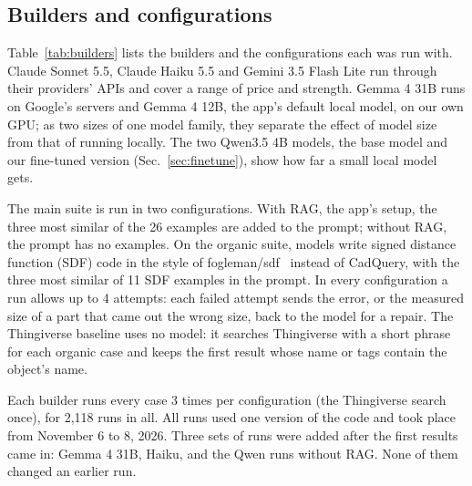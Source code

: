 \subsection{Builders and configurations}
Table~\ref{tab:builders} lists the builders and the configurations each was run with.
Claude Sonnet 5.5, Claude Haiku 5.5 and Gemini 3.5 Flash Lite run through their providers' APIs and cover a range of price and strength.
Gemma 4 31B runs on Google's servers and Gemma 4 12B, the app's default local model, on our own GPU; as two sizes of one model family, they separate the effect of model size from that of running locally.
The two Qwen3.5 4B models, the base model and our fine-tuned version (Sec.~\ref{sec:finetune}), show how far a small local model gets.

The main suite is run in two configurations.
With RAG, the app's setup, the three most similar of the 26 examples are added to the prompt; without RAG, the prompt has no examples.
On the organic suite, models write signed distance function (SDF) code in the style of fogleman/sdf~\cite{fogleman_sdf} instead of CadQuery, with the three most similar of 11 SDF examples in the prompt.
In every configuration a run allows up to 4 attempts: each failed attempt sends the error, or the measured size of a part that came out the wrong size, back to the model for a repair.
The Thingiverse baseline uses no model: it searches Thingiverse with a short phrase for each organic case and keeps the first result whose name or tags contain the object's name.

Each builder runs every case 3 times per configuration (the Thingiverse search once), for 2,118 runs in all.
All runs used one version of the code and took place from November 6 to 8, 2026.
Three sets of runs were added after the first results came in: Gemma 4 31B, Haiku, and the Qwen runs without RAG.
None of them changed an earlier run.

